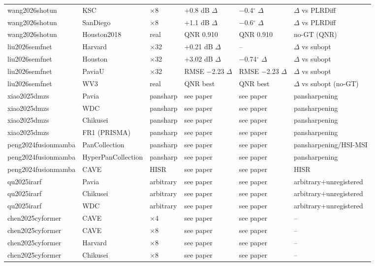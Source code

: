 \documentclass[11pt]{article}
\begin{document}
\begin{longtable}{@{}p{2.6cm}p{2.6cm}p{1.6cm}p{2.0cm}p{1.9cm}p{3.1cm}@{}}
wang2026shotun & KSC & $\times$8 & +0.8 dB $\Delta$ & $-$0.4$^\circ$ $\Delta$ & $\Delta$ vs PLRDiff \\
wang2026shotun & SanDiego & $\times$8 & +1.1 dB $\Delta$ & $-$0.6$^\circ$ $\Delta$ & $\Delta$ vs PLRDiff \\
wang2026shotun & Houston2018 & real & QNR 0.910 & QNR 0.910 & no-GT (QNR) \\
liu2026semfnet & Harvard & $\times$32 & +0.21 dB $\Delta$ & -- & $\Delta$ vs subopt \\
liu2026semfnet & Houston & $\times$32 & +3.02 dB $\Delta$ & $-$0.74$^\circ$ $\Delta$ & $\Delta$ vs subopt \\
liu2026semfnet & PaviaU & $\times$32 & RMSE $-$2.23 $\Delta$ & RMSE $-$2.23 $\Delta$ & $\Delta$ vs subopt \\
liu2026semfnet & WV3 & real & QNR best & QNR best & $\Delta$ vs subopt (no-GT) \\
xiao2025dmzs & Pavia & pansharp & see paper & see paper & pansharpening \\
xiao2025dmzs & WDC & pansharp & see paper & see paper & pansharpening \\
xiao2025dmzs & Chikusei & pansharp & see paper & see paper & pansharpening \\
xiao2025dmzs & FR1 (PRISMA) & pansharp & see paper & see paper & pansharpening \\
peng2024fusionmamba & PanCollection & pansharp & see paper & see paper & pansharpening/HSI-MSI \\
peng2024fusionmamba & HyperPanCollection & pansharp & see paper & see paper & pansharpening \\
peng2024fusionmamba & CAVE & HISR & see paper & see paper & HISR \\
qu2025irarf & Pavia & arbitrary & see paper & see paper & arbitrary+unregistered \\
qu2025irarf & Chikusei & arbitrary & see paper & see paper & arbitrary+unregistered \\
qu2025irarf & WDC & arbitrary & see paper & see paper & arbitrary+unregistered \\
chen2025cyformer & CAVE & $\times$4 & see paper & see paper & -- \\
chen2025cyformer & CAVE & $\times$8 & see paper & see paper & -- \\
chen2025cyformer & Harvard & $\times$8 & see paper & see paper & -- \\
chen2025cyformer & Chikusei & $\times$8 & see paper & see paper & -- \\

\end{longtable}
\end{document}
